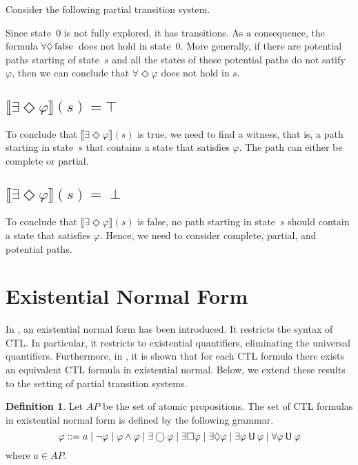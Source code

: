 \documentclass[12pt]{article}
\newcommand{\always}{\Box}
\newcommand{\eventually}{\Diamond}
\newcommand{\nxt}{\bigcirc}
\newcommand{\until}{\mathbin{\sf U}}
\newcommand{\FALSE}{\mbox{\lstinline{false}}}
\theoremstyle{definition}
\newtheorem{definition}{Definition}
\newcommand{\satisfaction}[1]{\llbracket #1 \rrbracket}
\newenvironment{franck}{\color{red}}{\color{black}}
\begin{document}
\begin{franck}
Consider the following partial transition system.
\begin{center}
\end{center}
Since state~0 is not fully explored, it has transitions.  As a consequence, the formula $\forall \eventually \FALSE$ does not hold in state~0.  More generally, if there are potential paths starting of state~$s$ and all the states of those potential paths do not satify $\varphi$, then we can conclude that $\forall \eventually \varphi$ does not hold in $s$.

\subsection*{$\satisfaction{\exists \eventually \varphi}(s) = \top$}

To conclude that $\satisfaction{\exists \eventually \varphi}(s)$ is true, we need to find a witness, that is, a path starting in state~$s$ that contains a state that satisfies $\varphi$.  The path can either be complete or partial.

\subsection*{$\satisfaction{\exists \eventually \varphi}(s) = \perp$}

To conclude that $\satisfaction{\exists \eventually \varphi}(s)$ is false, no path starting in state~$s$ should contain a state that satisfies $\varphi$.  Hence, we need to consider complete, partial, and potential paths.
\end{franck}

\section{Existential Normal Form}

In \cite[Definition~6.13]{BK08}, an existential normal form has been introduced.  It restricts the syntax of CTL.  In particular, it restricts to existential quantifiers, eliminating the universal quantifiers.  Furthermore, in \cite[Theorem~6.14]{BK08}, it is shown that for each CTL formula there exists an equivalent CTL formula in existential normal.  Below, we extend these results to the setting of partial transition systems.

\begin{definition}
Let $\mathit{AP}$ be the set of atomic propositions.  The set of CTL formulas in existential normal form is defined by the following grammar.
\[
\varphi
::= a
\mid \neg \varphi
\mid \varphi \wedge \varphi
\mid \exists \nxt \varphi
\mid \exists \always \varphi
\mid \exists \eventually \varphi
\mid \exists \varphi \until \varphi
\mid \forall \varphi \until \varphi
\]
where $a \in \mathit{AP}$.
\end{definition}
\end{document}
